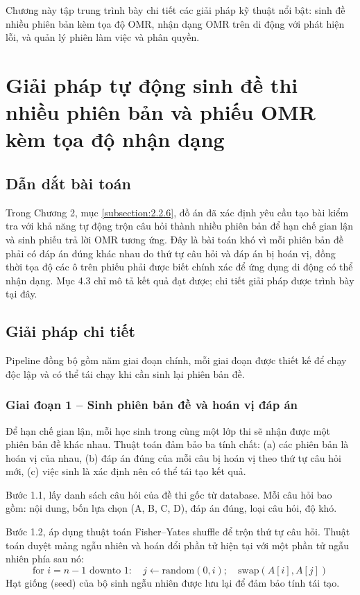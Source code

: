 ﻿\documentclass[../DoAn.tex]{subfiles}
\begin{document}
Chương này tập trung trình bày chi tiết các giải pháp kỹ thuật nổi bật: sinh đề nhiều phiên bản kèm tọa độ OMR, nhận dạng OMR trên di động với phát hiện lỗi, và quản lý phiên làm việc và phân quyền.

\section{Giải pháp tự động sinh đề thi nhiều phiên bản và phiếu OMR kèm tọa độ nhận dạng}
\label{section:5.1}

\subsection{Dẫn dắt bài toán}
Trong Chương 2, mục \ref{subsection:2.2.6}, đồ án đã xác định yêu cầu tạo bài kiểm tra với khả năng tự động trộn câu hỏi thành nhiều phiên bản để hạn chế gian lận và sinh phiếu trả lời OMR tương ứng. Đây là bài toán khó vì mỗi phiên bản đề phải có đáp án đúng khác nhau do thứ tự câu hỏi và đáp án bị hoán vị, đồng thời tọa độ các ô trên phiếu phải được biết chính xác để ứng dụng di động có thể nhận dạng. Mục 4.3 chỉ mô tả kết quả đạt được; chi tiết giải pháp được trình bày tại đây.

\subsection{Giải pháp chi tiết}
Pipeline đồng bộ gồm năm giai đoạn chính, mỗi giai đoạn được thiết kế để chạy độc lập và có thể tái chạy khi cần sinh lại phiên bản đề.

\subsubsection{Giai đoạn 1 -- Sinh phiên bản đề và hoán vị đáp án}
Để hạn chế gian lận, mỗi học sinh trong cùng một lớp thi sẽ nhận được một phiên bản đề khác nhau. Thuật toán đảm bảo ba tính chất: (a) các phiên bản là hoán vị của nhau, (b) đáp án đúng của mỗi câu bị hoán vị theo thứ tự câu hỏi mới, (c) việc sinh là xác định nên có thể tái tạo kết quả.

Bước 1.1, lấy danh sách câu hỏi của đề thi gốc từ database. Mỗi câu hỏi bao gồm: nội dung, bốn lựa chọn (A, B, C, D), đáp án đúng, loại câu hỏi, độ khó.

Bước 1.2, áp dụng thuật toán Fisher--Yates shuffle để trộn thứ tự câu hỏi. Thuật toán duyệt mảng ngẫu nhiên và hoán đổi phần tử hiện tại với một phần tử ngẫu nhiên phía sau nó:
\begin{equation}
    \text{for } i = n-1 \text{ downto } 1: \quad j \gets \text{random}(0, i); \quad \text{swap}(A[i], A[j])
\end{equation}
Hạt giống (seed) của bộ sinh ngẫu nhiên được lưu lại để đảm bảo tính tái tạo.
\end{document}
